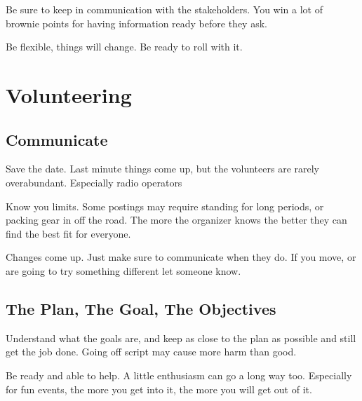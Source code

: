 \documentclass[11pt]{beamer}
\begin{document}
\begin{frame}
	Be sure to keep in communication with the stakeholders. You win a lot of brownie points for having information ready before they ask.
\end{frame}

\begin{frame}
	Be flexible, things will change. Be ready to roll with it.
\end{frame}

\section{Volunteering}

\subsection{Communicate}

\begin{frame}
	Save the date. Last minute things come up, but the volunteers are rarely overabundant. Especially radio operators
\end{frame}

\begin{frame}
	Know you limits. Some postings may require standing for long periods, or packing gear in off the road. The more the organizer knows the better they can find the best fit for everyone.
\end{frame}

\begin{frame}
	Changes come up. Just make sure to communicate when they do. If you move, or are going to try something different let someone know.
\end{frame}

\subsection{The Plan, The Goal, The Objectives}

\begin{frame}
	Understand what the goals are, and keep as close to the plan as possible and still get the job done. Going off script may cause more harm than good.
\end{frame}

\begin{frame}
	Be ready and able to help. A little enthusiasm can go a long way too. Especially for fun events, the more you get into it, the more you will get out of it.
\end{frame}
\end{document}
